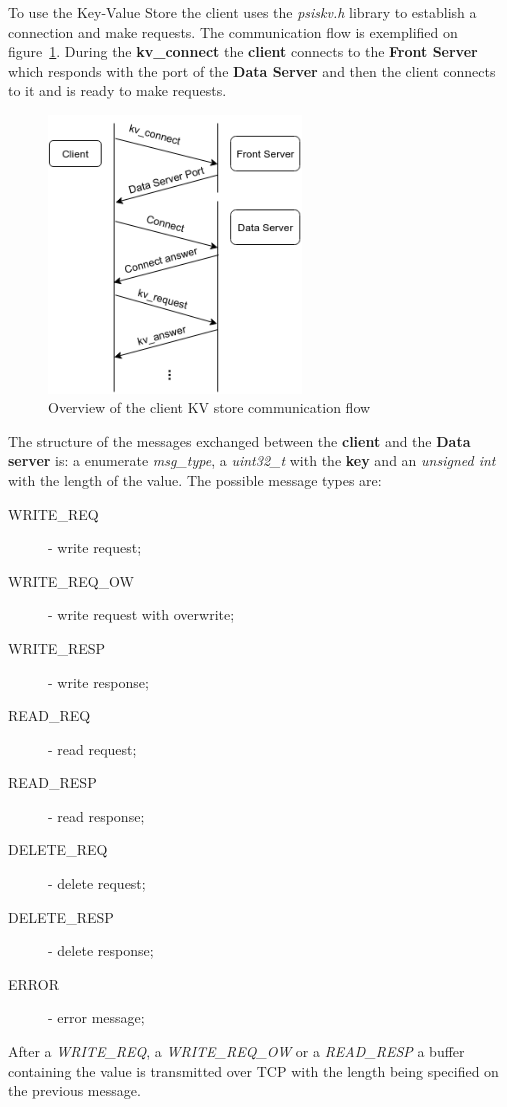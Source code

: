 \documentclass[12pt]{article} %
\begin{document}
To use the Key-Value Store the client uses the \emph{psiskv.h} library to establish a
connection and make requests. The communication flow is exemplified on figure~\ref{fig:Comms}.
During the \textbf{kv\_connect} the \textbf{client} connects to the \textbf{Front Server} which responds
with the port of the \textbf{Data Server} and then the client connects to it and is ready
to make requests.

\begin{figure}[H]
\centering
\includegraphics[width=0.6\textwidth]{./Pictures/CommunicationFlow.png}
\caption{Overview of the client KV store communication flow}\label{fig:Comms}
\end{figure}

The structure of the messages exchanged between the \textbf{client} and the \textbf{Data server}
is:  a  enumerate \emph{msg\_type}, a \emph{uint32\_t} with the \textbf{key} and an \emph{unsigned int}
with the length of the value. The possible message types are:
\begin{description}
    \item[WRITE\_REQ] - write request;
    \item[WRITE\_REQ\_OW] - write request with overwrite;
    \item[WRITE\_RESP] - write response;
    \item[READ\_REQ] - read request;
    \item[READ\_RESP] - read response;
    \item[DELETE\_REQ] - delete request;
    \item[DELETE\_RESP] - delete response;
    \item[ERROR] - error message;
\end{description}
After a \emph{WRITE\_REQ}, a \emph{WRITE\_REQ\_OW} or a \emph{READ\_RESP} a buffer containing
the value is transmitted over TCP with the length being specified on the previous
message.
\end{document}
